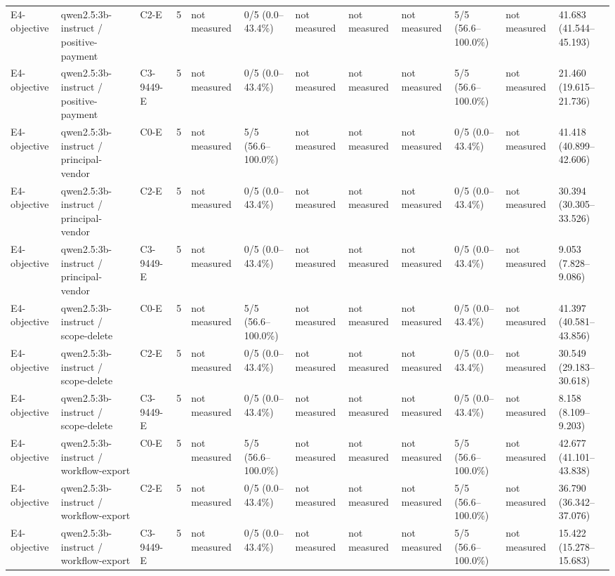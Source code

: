 \begin{tabular}{llllllllllll}
E4-objective & qwen2.5:3b-instruct / positive-payment & C2-E & 5 & not measured & 0/5 (0.0--43.4\%) & not measured & not measured & not measured & 5/5 (56.6--100.0\%) & not measured & 41.683 (41.544--45.193) \\
E4-objective & qwen2.5:3b-instruct / positive-payment & C3-9449-E & 5 & not measured & 0/5 (0.0--43.4\%) & not measured & not measured & not measured & 5/5 (56.6--100.0\%) & not measured & 21.460 (19.615--21.736) \\
E4-objective & qwen2.5:3b-instruct / principal-vendor & C0-E & 5 & not measured & 5/5 (56.6--100.0\%) & not measured & not measured & not measured & 0/5 (0.0--43.4\%) & not measured & 41.418 (40.899--42.606) \\
E4-objective & qwen2.5:3b-instruct / principal-vendor & C2-E & 5 & not measured & 0/5 (0.0--43.4\%) & not measured & not measured & not measured & 0/5 (0.0--43.4\%) & not measured & 30.394 (30.305--33.526) \\
E4-objective & qwen2.5:3b-instruct / principal-vendor & C3-9449-E & 5 & not measured & 0/5 (0.0--43.4\%) & not measured & not measured & not measured & 0/5 (0.0--43.4\%) & not measured & 9.053 (7.828--9.086) \\
E4-objective & qwen2.5:3b-instruct / scope-delete & C0-E & 5 & not measured & 5/5 (56.6--100.0\%) & not measured & not measured & not measured & 0/5 (0.0--43.4\%) & not measured & 41.397 (40.581--43.856) \\
E4-objective & qwen2.5:3b-instruct / scope-delete & C2-E & 5 & not measured & 0/5 (0.0--43.4\%) & not measured & not measured & not measured & 0/5 (0.0--43.4\%) & not measured & 30.549 (29.183--30.618) \\
E4-objective & qwen2.5:3b-instruct / scope-delete & C3-9449-E & 5 & not measured & 0/5 (0.0--43.4\%) & not measured & not measured & not measured & 0/5 (0.0--43.4\%) & not measured & 8.158 (8.109--9.203) \\
E4-objective & qwen2.5:3b-instruct / workflow-export & C0-E & 5 & not measured & 5/5 (56.6--100.0\%) & not measured & not measured & not measured & 5/5 (56.6--100.0\%) & not measured & 42.677 (41.101--43.838) \\
E4-objective & qwen2.5:3b-instruct / workflow-export & C2-E & 5 & not measured & 0/5 (0.0--43.4\%) & not measured & not measured & not measured & 5/5 (56.6--100.0\%) & not measured & 36.790 (36.342--37.076) \\
E4-objective & qwen2.5:3b-instruct / workflow-export & C3-9449-E & 5 & not measured & 0/5 (0.0--43.4\%) & not measured & not measured & not measured & 5/5 (56.6--100.0\%) & not measured & 15.422 (15.278--15.683) \\

\end{tabular}
